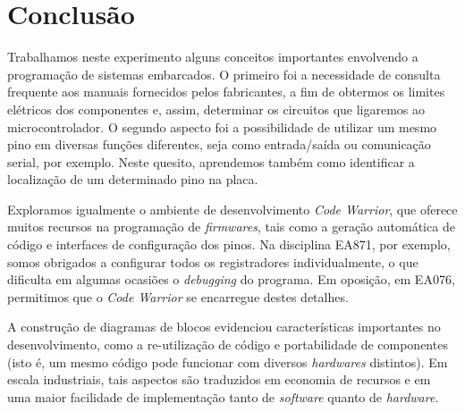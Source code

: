 \section{Conclusão}

Trabalhamos neste experimento alguns conceitos importantes envolvendo a
programação de sistemas embarcados. O primeiro foi a necessidade de consulta
frequente aos manuais fornecidos pelos fabricantes, a fim de obtermos os
limites elétricos dos componentes e, assim, determinar os circuitos que
ligaremos ao microcontrolador. O segundo aspecto foi a possibilidade de utilizar
um mesmo pino em diversas funções diferentes, seja como entrada/saída ou
comunicação serial, por exemplo. Neste quesito, aprendemos também como
identificar a localização  de um determinado pino na placa.

\vspace{12pt}

Exploramos igualmente o ambiente de desenvolvimento \textit{Code Warrior}, que
oferece muitos recursos na programação de \textit{firmwares}, tais como a
geração automática de código e interfaces de configuração dos pinos. Na
disciplina EA871, por exemplo, somos obrigados a configurar todos os
registradores individualmente, o que dificulta em algumas ocasiões o
\textit{debugging} do programa. Em oposição, em EA076, permitimos que o
\textit{Code Warrior} se encarregue destes detalhes.

\vspace{12pt}

A construção de diagramas de blocos evidenciou características importantes no
desenvolvimento, como a re-utilização de código e portabilidade de componentes
(isto é, um mesmo código pode funcionar com diversos \textit{hardwares}
distintos). Em escala industriais, tais aspectos são traduzidos em economia de
recursos e em uma maior facilidade de implementação tanto de \textit{software}
quanto de \textit{hardware}.

